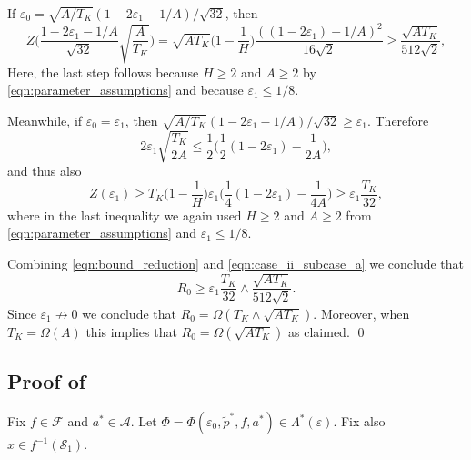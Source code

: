 \documentclass[11pt]{article}
\newcommand{\mcA}{\mathcal{A}}
\newcommand{\mcF}{\mathcal{F}}
\newcommand{\mcS}{\mathcal{S}}
\theoremstyle{definition}
\theoremstyle{definition}
\begin{document}
If $\varepsilon_0 = \sqrt{A/T_K}(1-2\varepsilon_1-1/A)/\sqrt{32}$, then
\begin{equation}
	\label{eqn:bound_reduction}
	Z\biggl(\frac{1-2\varepsilon_1-1/A}{\sqrt{32}}\sqrt{\frac{A}{T_K}}\biggr)
	=
	\sqrt{AT_K}\biggl(1-\frac{1}{H}\biggr)
	\frac{((1-2\varepsilon_1)-1/A)^2}{16\sqrt{2}}
	\geq
	\frac{\sqrt{AT_K}}{512\sqrt{2}}
	,
\end{equation}
Here, the last step follows because $H\geq 2$ and $A\geq 2$ by \eqref{eqn:parameter_assumptions} and because $\varepsilon_1\leq 1/8$.

Meanwhile, if $\varepsilon_0 = \varepsilon_1$, then $\sqrt{A/T_K}(1-2\varepsilon_1-1/A)/\sqrt{32}\geq \varepsilon_1$.
Therefore
\begin{equation}
	2\varepsilon_1\sqrt{\frac{T_K}{2A}}
	\leq
	\frac{1}{2}\biggl(\frac{1}{2}(1-2\varepsilon_1)-\frac{1}{2A}\biggr)
	,
\end{equation}
and thus also
\begin{equation}
	\label{eqn:case_ii_subcase_a}
	Z(\varepsilon_1)
	\geq
	T_K
	\biggl(1-\frac{1}{H}\biggr)
	\varepsilon_1
	\biggl(
	\frac{1}{4}(1-2\varepsilon_1)
	-
	\frac{1}{4A}
	\biggr)
	\geq
	\varepsilon_1\frac{T_K}{32}
	,
\end{equation}
where in the last inequality we again used $H\geq 2$ and $A\geq 2$ from \eqref{eqn:parameter_assumptions} and $\varepsilon_1\leq 1/8$.

Combining \eqref{eqn:bound_reduction} and \eqref{eqn:case_ii_subcase_a} we conclude that
\begin{equation}
	R_0
	\geq
	\varepsilon_1\frac{T_K}{32}\wedge \frac{\sqrt{AT_K}}{512\sqrt{2}}
	.
\end{equation}
Since $\varepsilon_1 \not\rightarrow 0$ we conclude that $R_0 = \Omega(T_K\wedge \sqrt{AT_K})$.
Moreover, when $T_K = \Omega(A)$ this implies that $R_0 = \Omega(\sqrt{AT_K})$ as claimed.
\qed

\subsection{Proof of \texorpdfstring{}{relation regret and clustering error}}
\label{sec:proof_of_relation_between_regret_and_clustering_error}

Fix $f\in\mcF$ and $a^*\in\mcA$.
Let $\Phi=\Phi(\varepsilon_0,\tilde{p}^*,f,a^*)\in\Lambda^*(\varepsilon)$.
Fix also $x\in f^{-1}(\mcS_1)$.
\end{document}
